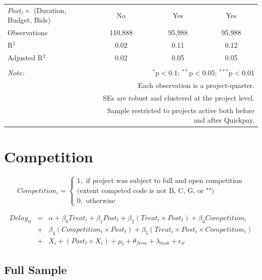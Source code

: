 \documentclass[
]{article}
\begin{document}
\begin{table}[H]
\begin{tabular}{@{\extracolsep{-2pt}}lccc}
$Post_t \times$  (Duration, Budget, Bids) & No & Yes & Yes \\ 
Observations & 110,888 & 95,988 & 95,988 \\ 
R$^{2}$ & 0.02 & 0.11 & 0.12 \\ 
Adjusted R$^{2}$ & 0.02 & 0.05 & 0.05 \\ 
\hline 
\hline \\[-1.8ex] 
\textit{Note:}  & \multicolumn{3}{r}{$^{*}$p$<$0.1; $^{**}$p$<$0.05; $^{***}$p$<$0.01} \\ 
 & \multicolumn{3}{r}{Each observation is a project-quarter.} \\ 
 & \multicolumn{3}{r}{SEs are robust and clustered at the project level.} \\ 
 & \multicolumn{3}{r}{Sample restricted to projects active both before and after Quickpay.} \\ 
\end{tabular} 
\end{table}

\hypertarget{competition}{%
\section{Competition}\label{competition}}

\[ Competition_i = \begin{cases} 1, \text{ if project was subject to full and open competition}\\ 
                       \text{(extent competed code is not B, C, G, or "")}\\
0, \text{ otherwise} \end{cases}\]

\[ \begin{aligned}
Delay_{it} &=& \alpha+\beta_0 Treat_i + \beta_1 Post_t + \beta_2 (Treat_i \times Post_t) +\beta_3 Competition_i \\
&+& \beta_4 (Competition_i \times Post_t) + \beta_5 (Treat_i \times Post_t \times Competition_i) \\ 
&+&X_i + (Post_t \times X_i) + \mu_t + \theta_{firm} + \lambda_{task}+ \epsilon_{it}
\end{aligned}\]

\hypertarget{full-sample-1}{%
\subsection{Full Sample}\label{full-sample-1}}
\end{document}
